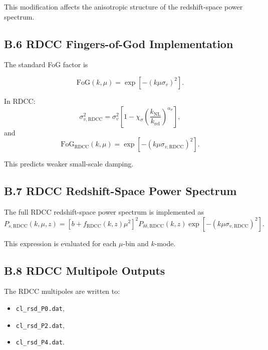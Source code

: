 \documentclass[11pt,a4paper]{article}
\begin{document}
This modification affects the anisotropic structure of the redshift-space power spectrum.

\subsection*{B.6 RDCC Fingers-of-God Implementation}

The standard FoG factor is


\[
\mathrm{FoG}(k,\mu) = \exp[-(k\mu\sigma_{v})^{2}].
\]



In RDCC:
\begin{equation}
\sigma_{v,\mathrm{RDCC}}^{2}
=
\sigma_{v}^{2}
\left[
1
-
\chi_{\sigma}
\left(
\frac{k_{\mathrm{NL}}}{k_{\mathrm{rel}}}
\right)^{\alpha_{\sigma}}
\right],
\end{equation}
and
\begin{equation}
\mathrm{FoG}_{\mathrm{RDCC}}(k,\mu)
=
\exp[-(k\mu\sigma_{v,\mathrm{RDCC}})^{2}].
\end{equation}

This predicts weaker small-scale damping.

\subsection*{B.7 RDCC Redshift-Space Power Spectrum}

The full RDCC redshift-space power spectrum is implemented as
\begin{equation}
P_{s,\mathrm{RDCC}}(k,\mu,z)
=
\left[
b + f_{\mathrm{RDCC}}(k,z)\mu^{2}
\right]^{2}
P_{\delta\delta,\mathrm{RDCC}}(k,z)
\exp[-(k\mu\sigma_{v,\mathrm{RDCC}})^{2}].
\end{equation}

This expression is evaluated for each $\mu$-bin and $k$-mode.

\subsection*{B.8 RDCC Multipole Outputs}

The RDCC multipoles are written to:

\begin{itemize}
\item \texttt{cl\_rsd\_P0.dat},
\item \texttt{cl\_rsd\_P2.dat},
\item \texttt{cl\_rsd\_P4.dat}.
\end{itemize}
\end{document}
